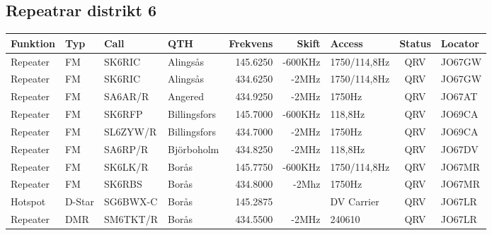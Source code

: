 \begin{landscape}
\subsection{Repeatrar distrikt 6}
\footnotesize
\begin{longtable}{llllrrlcl}
	\textbf{Funktion}         & \textbf{Typ}  & \textbf{Call} & \textbf{QTH}        & \textbf{Frekvens} & \textbf{Skift} & \textbf{Access}  & \textbf{Status} & \textbf{Locator} \\ \hline
	\endhead
	Repeater                  & FM            & SK6RIC        & Alingsås            & 145.6250          & -600KHz        & 1750/114,8Hz     & QRV             & JO67GW           \\
	Repeater                  & FM            & SK6RIC        & Alingsås            & 434.6250          & -2MHz          & 1750/114,8Hz     & QRV             & JO67GW           \\
	Repeater                  & FM            & SA6AR/R       & Angered             & 434.9250          & -2MHz          & 1750Hz           & QRV             & JO67AT           \\
	Repeater                  & FM            & SK6RFP        & Billingsfors        & 145.7000          & -600KHz        & 118,8Hz          & QRV             & JO69CA           \\
	Repeater                  & FM            & SL6ZYW/R      & Billingsfors        & 434.7000          & -2MHz          & 1750Hz           & QRV             & JO69CA           \\
	Repeater                  & FM            & SA6RP/R       & Björboholm          & 434.8250          & -2MHz          & 118,8Hz          & QRV             & JO67DV           \\
	Repeater                  & FM            & SK6LK/R       & Borås               & 145.7750          & -600KHz        & 1750/114,8Hz     & QRV             & JO67MR           \\
	Repeater                  & FM            & SK6RBS        & Borås               & 434.8000          & -2Mhz          & 1750Hz           & QRV             & JO67MR           \\
	Hotspot                   & D-Star        & SG6BWX-C      & Borås               & 145.2875          &                & DV Carrier       & QRV             & JO67LR           \\
	Repeater                  & DMR           & SM6TKT/R      & Borås               & 434.5500          & -2MHz          & 240610           & QRV             & JO67LR           \\

\end{longtable}
\end{landscape}
